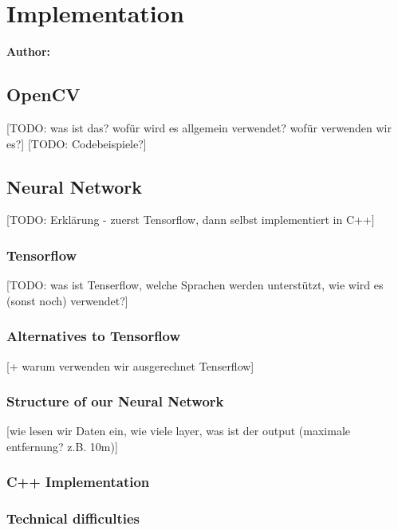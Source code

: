 \chapter{Implementation}

\textbf{Author: } 


\section{OpenCV}

[TODO: was ist das? wofür wird es allgemein verwendet? wofür verwenden wir es?]
[TODO: Codebeispiele?]

\section{Neural Network}

[TODO: Erklärung - zuerst Tensorflow, dann selbst implementiert in C++]

\subsection{Tensorflow}

[TODO: was ist Tenserflow, welche Sprachen werden unterstützt, wie wird es (sonst noch) verwendet?]

\subsection{Alternatives to Tensorflow}

[+ warum verwenden wir ausgerechnet Tenserflow]

\subsection{Structure of our Neural Network}

[wie lesen wir Daten ein, wie viele layer, was ist der output (maximale entfernung? z.B. 10m)]

\subsection{C++ Implementation}

\subsection{Technical difficulties}

\filbreak